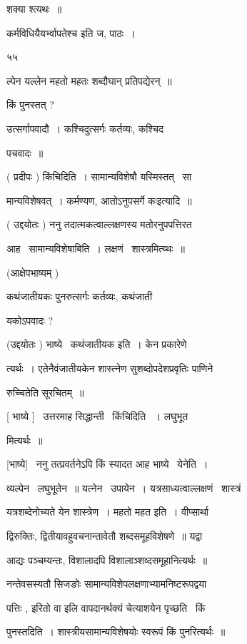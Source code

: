 \documentclass[11pt, openany]{book}
\begin{document}
शक्या श्त्यथः~॥ 

कर्मविधियैयर्भ्वापतेश्च इति ज, पाठः~। 

५५ 





ल्पेन यल्लेन महतो महतः शब्दौघान् प्रतिपद्येरन्~॥ 

किं पुनस्तत् ? 

उत्सर्गापवादौ~। कश्चिदुत्सर्गः कर्तव्यः, कश्चिद \textendash\ 

पचवादः~॥ 

( प्रदीपः ) किंचिदिति~। सामान्यविशेषौ यस्मिस्तत् \textendash\ सा \textendash\ 

मान्यविशेषवत्~। {\qt कर्मण्यण, आतोऽनुपसर्गे कः}इत्यादि~॥ 

( उद्दयोतः ) ननु तदात्मकत्वाल्लक्षणस्य मतोरनुपपत्तिरत 

आह \textendash\ सामान्यविशेषाबिति~। लक्षणं \textendash\ शास्त्रमित्य्थः~॥ 

(आक्षेपभाष्यम् ) 

कथंजातीयकः पुनरुत्सर्गः कर्तव्यः, कथंजाती \textendash\ 

यकोऽपवादः ? 

(उद्दयोतः ) भाष्ये \textendash\ कथंजातीयक इति~। केन प्रकारेणे \textendash\ 

त्यर्थः~। एतेनैवंजातीयकेन शास्त्नेण सुशब्दोपदेशप्रवृतिः पाणिने \textendash\ 

रुच्चितेति सूरचितम्~॥ 

[ भाष्ये ] \textendash\ उत्तरमाह सिद्धान्ती \textendash\ किंचिदिति ~। लघुभूत 

मित्यर्थः~॥ 

[भाष्ये] \textendash\ ननु तत्प्रवर्तनेऽपि किं स्यादत आह भाष्ये \textendash\ येनेति~। 

व्यल्पेन \textendash\ लघुभूतेन~॥ यत्नेन \textendash\ उपायेन~। यत्रसाध्यत्वाल्लक्षणं \textendash\ शास्त्रं 

यत्रशब्देनोच्यते येन शास्त्रेण~। महतो महत इति~। वीप्सार्था 

द्विरुक्तिः, द्वितीयावहुवचनान्तावेतौ शब्दसमूहविशेषणे~॥ यद्वा \textendash\ 

आद्यः पञ्चम्यन्तः, विशालादपि विशालाञ्शव्दसमूहानित्यर्थः~॥ 

नन्तेवसस्यतौ सिजङोः सामान्यविशेपलक्षणाभ्यामनिष्टरूपद्वया \textendash\ 

पत्तिः , {\qt इरितो वा} इलि वापदानर्थक्यं चेत्याशयेन पृच्छति \textendash\ किं 

पुनस्तदिति~। शास्त्रीयसामान्यविशेषयोः स्वरूपं किं पुनरित्यर्थः~॥ 
\end{document}
